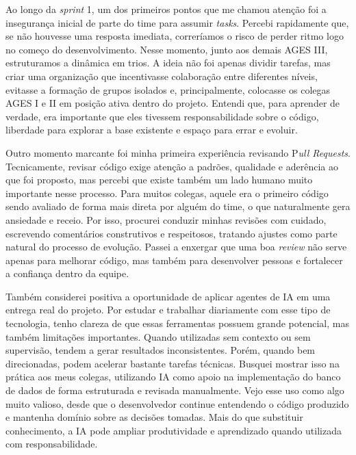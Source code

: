 \begin{reflection}
\indent \originaltab{}Ao longo da \textit{sprint} 1, um dos primeiros pontos que me chamou atenção foi a insegurança inicial de parte do time para assumir \textit{tasks}. Percebi rapidamente que, se não houvesse uma resposta imediata, correríamos o risco de perder ritmo logo no começo do desenvolvimento. Nesse momento, junto aos demais AGES III, estruturamos a dinâmica em trios. A ideia não foi apenas dividir tarefas, mas criar uma organização que incentivasse colaboração entre diferentes níveis, evitasse a formação de grupos isolados e, principalmente, colocasse os colegas AGES I e II em posição ativa dentro do projeto. Entendi que, para aprender de verdade, era importante que eles tivessem responsabilidade sobre o código, liberdade para explorar a base existente e espaço para errar e evoluir.\par

\indent \originaltab{}Outro momento marcante foi minha primeira experiência revisando P\textit{ull Requests}. Tecnicamente, revisar código exige atenção a padrões, qualidade e aderência ao que foi proposto, mas percebi que existe também um lado humano muito importante nesse processo. Para muitos colegas, aquele era o primeiro código sendo avaliado de forma mais direta por alguém do time, o que naturalmente gera ansiedade e receio. Por isso, procurei conduzir minhas revisões com cuidado, escrevendo comentários construtivos e respeitosos, tratando ajustes como parte natural do processo de evolução. Passei a enxergar que uma boa \textit{review} não serve apenas para melhorar código, mas também para desenvolver pessoas e fortalecer a confiança dentro da equipe.\par

\indent \originaltab{}Também considerei positiva a oportunidade de aplicar agentes de IA em uma entrega real do projeto. Por estudar e trabalhar diariamente com esse tipo de tecnologia, tenho clareza de que essas ferramentas possuem grande potencial, mas também limitações importantes. Quando utilizadas sem contexto ou sem supervisão, tendem a gerar resultados inconsistentes. Porém, quando bem direcionadas, podem acelerar bastante tarefas técnicas. Busquei mostrar isso na prática aos meus colegas, utilizando IA como apoio na implementação do banco de dados de forma estruturada e revisada manualmente. Vejo esse uso como algo muito valioso, desde que o desenvolvedor continue entendendo o código produzido e mantenha domínio sobre as decisões tomadas. Mais do que substituir conhecimento, a IA pode ampliar produtividade e aprendizado quando utilizada com responsabilidade.\par

\end{reflection}
